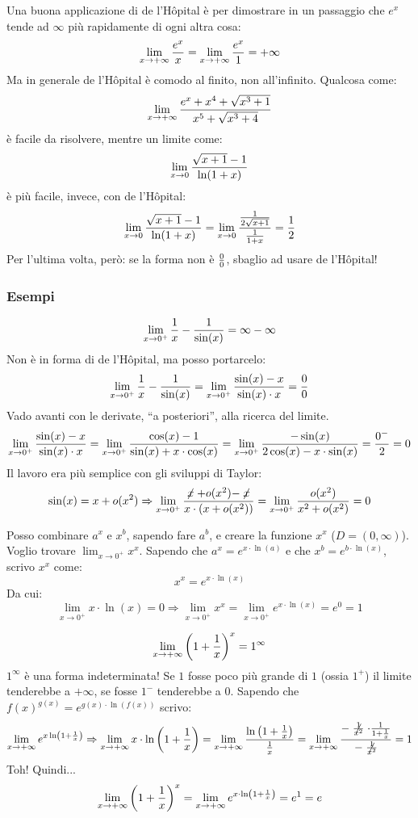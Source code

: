 \documentclass[12pt,a4paper]{article}
\begin{document}
Una buona applicazione di de l'H\^{o}pital \`e per dimostrare in un passaggio
che $e^x$ tende ad $\infty$ pi\`u rapidamente di ogni altra cosa:
$$
\lim_{x \to +\infty} {e^x \over x} = \lim_{x \to +\infty} {e^x \over 1} =
+\infty
$$
Ma in generale de l'H\^{o}pital \`e comodo al finito, non all'infinito.
Qualcosa come:
$$
\lim_{x \to +\infty} {e^x + x^4 + \sqrt{x^3+1} \over x^5 +
\sqrt{x^3+4}}
$$
\`e facile da risolvere, mentre un limite come:
$$
\lim_{x \to 0} {\sqrt{x + 1} - 1 \over \ln(1 +x)}
$$
\`e pi\`u facile, invece, con de l'H\^{o}pital:
$$
\lim_{x \to 0} {\sqrt{x + 1} - 1 \over \ln(1 +x)} =
\lim_{x \to 0} { {1 \over 2 \sqrt{x + 1}} \over {1 \over 1 + x}} =
{1 \over 2}
$$
Per l'ultima volta, per\`o: se la forma non \`e ${0 \over 0}$, sbaglio
ad usare de l'H\^{o}pital!

\subsubsection{Esempi}
$$
\lim_{x \to 0^+} {1 \over x} - {1 \over \sin(x)} = \infty - \infty
$$
Non \`e in forma di de l'H\^{o}pital, ma posso portarcelo:
$$
\lim_{x \to 0^+} {1 \over x} - {1 \over \sin(x)} = 
\lim_{x \to 0^+} {\sin(x) - x \over \sin(x) \cdot x} = {0 \over 0}
$$
Vado avanti con le derivate, ``a posteriori'', alla ricerca del limite.
$$
\lim_{x \to 0^+} {\sin(x) - x \over \sin(x) \cdot x} =
\lim_{x \to 0^+} {\cos(x) - 1 \over \sin(x) + x \cdot \cos(x)} =
\lim_{x \to 0^+} {-\sin(x) \over 2\cos(x) - x \cdot \sin(x)} =
{0^- \over 2} = 0
$$
Il lavoro era pi\`u semplice con gli sviluppi di Taylor:
$$
\sin(x) = x + o(x^2) \Rightarrow 
\lim_{x \to 0^+} {\centernot{x} + o(x^2) - \centernot{x} \over 
x \cdot (x + o(x^2))} = 
\lim_{x \to 0^+} {o(x^2) \over x^2 + o(x^2)} = 0
$$

Posso combinare $a^x$ e $x^b$, sapendo fare $a^b$, e creare la funzione
$x^x$ ($D = (0, \infty)$). Voglio trovare $\lim_{x \to 0^+} x^x$. Sapendo
che $a^x = e^{x \cdot \ln(a)}$ e che $x^b = e^{b \cdot \ln(x)}$, scrivo
$x^x$ come:
$$
x^x = e^{x \cdot \ln(x)}
$$
Da cui: 
$$
\lim_{x \to 0^+} x \cdot \ln(x) = 0 \Rightarrow
\lim_{x \to 0^+} x^x = \lim_{x \to 0^+} e^{x \cdot \ln(x)} =
e^0 = 1
$$

$$
\lim_{x \to +\infty} \left( 1 + {1 \over x} \right)^x = 1^{\infty}
$$
$1^{\infty}$ \`e una forma indeterminata! Se $1$ fosse poco pi\`u grande
di $1$ (ossia $1^+$) il limite tenderebbe a $+\infty$, se fosse $1^-$
tenderebbe a $0$. Sapendo che $f(x)^{g(x)} = e^{g(x) \cdot 
\ln \left( f(x) \right)}$ scrivo:
$$
\lim_{x \to +\infty} e^{x \ln \left( 1 + {1 \over x} \right)} \Rightarrow
\lim_{x \to +\infty} x \cdot \ln \left( 1 + {1 \over x} \right) =
\lim_{x \to +\infty} {\ln \left( 1 + {1 \over x} \right) \over {1 \over x}} =
\lim_{x \to +\infty} {-\centernot{{1 \over x^2}} \cdot {1 \over 1 + 
{1 \over x}} \over -\centernot{{1 \over x^2}}} = 1
$$
Toh! Quindi...
$$
\lim_{x \to +\infty} \left( 1 + {1 \over x} \right)^x = 
\lim_{x \to +\infty} e^{x \cdot \ln \left( 1 + {1 \over x} \right)} = 
e^1 = e
$$
\end{document}

